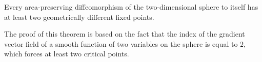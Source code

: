 Every area-preserving diffeomorphism of the two-dimensional sphere to itself has at least two geometrically different fixed points.

The proof of this theorem is based on the fact that the index of the gradient vector field of a smooth function of two variables on the sphere is equal to $2$, which forces at least two critical points.

